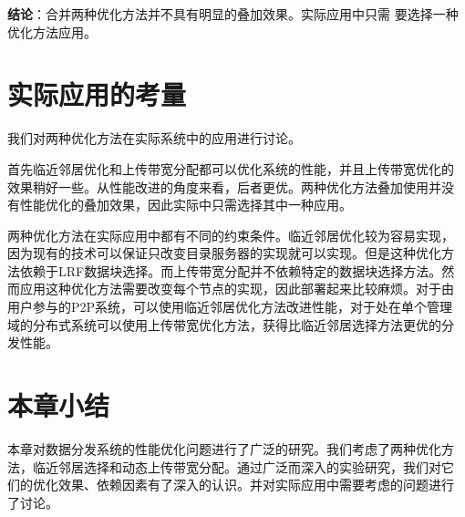 \textbf{结论}：合并两种优化方法并不具有明显的叠加效果。实际应用中只需
要选择一种优化方法应用。



\section{实际应用的考量}
\label{sec:btsuggest}

我们对两种优化方法在实际系统中的应用进行讨论。

首先临近邻居优化和上传带宽分配都可以优化系统的性能，并且上传带宽优化的
效果稍好一些。从性能改进的角度来看，后者更优。两种优化方法叠加使用并没
有性能优化的叠加效果，因此实际中只需选择其中一种应用。

两种优化方法在实际应用中都有不同的约束条件。临近邻居优化较为容易实现，
因为现有的技术可以保证只改变目录服务器的实现就可以实现。但是这种优化方
法依赖于LRF数据块选择。而上传带宽分配并不依赖特定的数据块选择方法。然
而应用这种优化方法需要改变每个节点的实现，因此部署起来比较麻烦。对于由
用户参与的P2P系统，可以使用临近邻居优化方法改进性能，对于处在单个管理
域的分布式系统可以使用上传带宽优化方法，获得比临近邻居选择方法更优的分
发性能。

\section{本章小结}
\label{sec:btconclude}

本章对数据分发系统的性能优化问题进行了广泛的研究。我们考虑了两种优化方
法，临近邻居选择和动态上传带宽分配。通过广泛而深入的实验研究，我们对它
们的优化效果、依赖因素有了深入的认识。并对实际应用中需要考虑的问题进行
了讨论。
